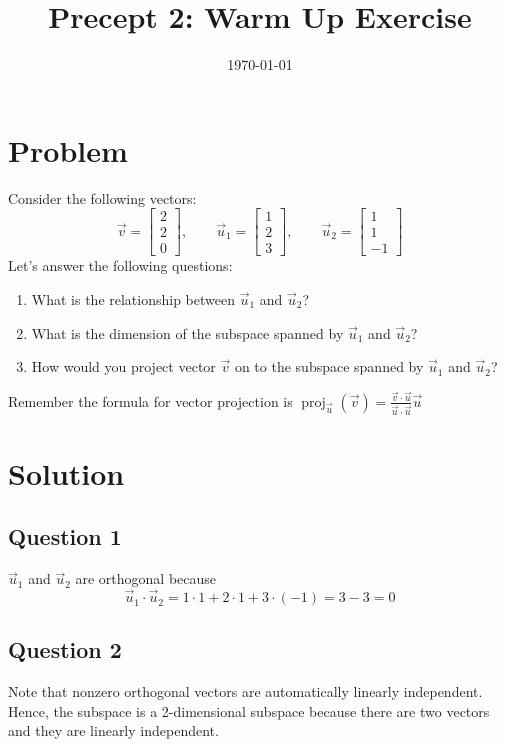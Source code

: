 \documentclass[11pt]{article}
\title{Precept 2: Warm Up Exercise}
\date{\today}
\begin{document}
\maketitle
\thispagestyle{fancy}

\section*{Problem}

Consider the following vectors:
\[
\vec{v}=\begin{bmatrix}
    2\\2\\0
\end{bmatrix},\qquad\vec{u}_1=\begin{bmatrix}
    1\\2\\3
\end{bmatrix},\qquad\vec{u}_2=\begin{bmatrix}
    1\\1\\-1
\end{bmatrix}
\]
Let's answer the following questions:
\begin{enumerate}
    \item What is the relationship between $\vec{u}_1$ and $\vec{u}_2$?
    \item What is the dimension of the subspace spanned by $\vec{u}_1$ and $\vec{u}_2$?
    \item How would you project vector $\vec{v}$ on to the subspace spanned by $\vec{u}_1$ and $\vec{u}_2$?
\end{enumerate}
Remember the formula for vector projection is $\operatorname{proj}_{\vec{u}}\left(\vec{v}\right)=\frac{\vec{v}\cdot \vec{u}}{\vec{u}\cdot \vec{u}}\vec{u}$

\section*{Solution}
\subsection*{Question 1}
$\vec{u}_1$ and $\vec{u}_2$ are orthogonal because
\[
\vec{u}_1\cdot \vec{u}_2 = 1\cdot 1 + 2\cdot 1 + 3\cdot\left(-1\right)=3-3=0
\]

\subsection*{Question 2}
Note that nonzero orthogonal vectors are automatically linearly independent. Hence, the subspace is a 2-dimensional subspace because there are two vectors and they are linearly independent.
\end{document}
